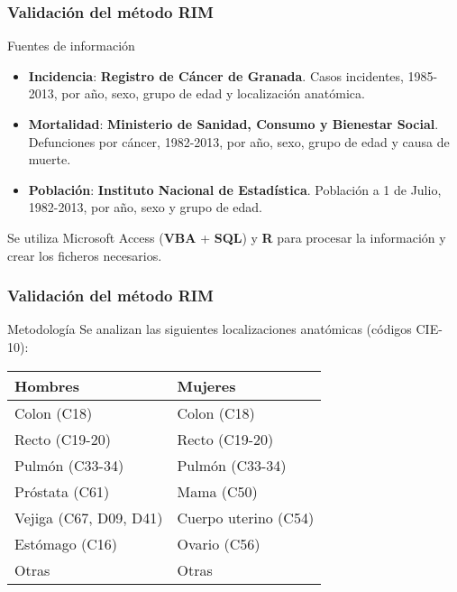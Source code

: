 \documentclass{beamer}
\begin{document}

\begin{frame}\frametitle{Validación del método RIM}

\begin{block}{Fuentes de información}
	\begin{itemize}
		\item \textbf{Incidencia}: \textbf{Registro de Cáncer de Granada}. Casos incidentes, 1985-2013, por año, sexo, grupo de edad y localización anatómica.\\[2ex]
		\item \textbf{Mortalidad}: \textbf{Ministerio de Sanidad, Consumo y Bienestar Social}. Defunciones por cáncer, 1982-2013, por año, sexo, grupo de edad y causa de muerte.\\[2ex]
		\item \textbf{Población}: \textbf{Instituto Nacional de Estadística}. Población a 1 de Julio, 1982-2013, por año, sexo y grupo de edad.\\[2ex]
	\end{itemize}
	Se utiliza Microsoft Access (\textbf{VBA} + \textbf{SQL}) y \textbf{R} para procesar la información y crear los ficheros necesarios.
\end{block}

\end{frame}


\begin{frame}\frametitle{Validación del método RIM}
	\begin{block}{Metodología}
		Se analizan las siguientes localizaciones anatómicas (códigos CIE-10):
		\begin{table}[]
			\begin{tabular}{ll}
				\textbf{Hombres} & \textbf{Mujeres} \\ \hline
				Colon (C18) & Colon (C18) \\ [1ex]
				Recto (C19-20) & Recto (C19-20)  \\ [1ex]
				Pulmón (C33-34) & Pulmón (C33-34) \\ [1ex]
				Próstata (C61) & Mama (C50) \\ [1ex]
				Vejiga (C67, D09, D41) & Cuerpo uterino (C54) \\ [1ex]
				Estómago (C16) & Ovario (C56)\\ [1ex]
				Otras & Otras \\[1ex]
			\end{tabular}
		\end{table}
	\end{block}
\end{frame}
\end{document}
